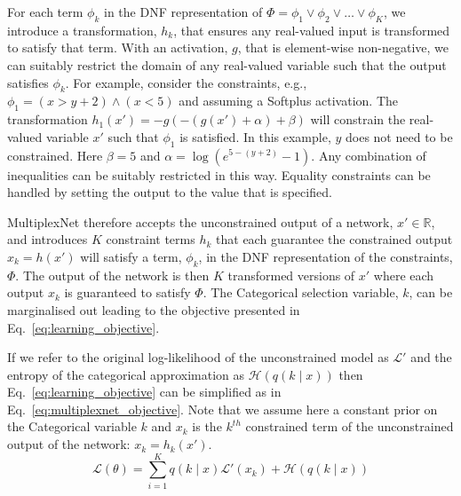 \documentclass[letterpaper]{article} %
\begin{document}
For each term $\phi_k$ in the DNF representation of $\Phi = \phi_1 \lor \phi_2 \lor \dots \lor \phi_K$, we introduce a transformation, $h_k$, that ensures any real-valued input is transformed to satisfy that term.
With an activation, $g$, that is element-wise non-negative, we can suitably restrict the domain of any real-valued variable such that the output satisfies $\phi_k$.
For example, consider the constraints, e.g., $\phi_1 = \left( x > y + 2 \right) \land \left( x < 5 \right)$ and assuming a Softplus activation.
The transformation $h_1(x') = -g(-(g(x') + \alpha) + \beta)$ will constrain the real-valued variable $x'$ such that $\phi_1$ is satisfied.
In this example, $y$ does not need to be constrained.
Here $\beta = 5$ and $\alpha = \log( e^{5 - (y + 2)} - 1)$.
Any combination of inequalities can be suitably restricted in this way.
Equality constraints can be handled by setting the output to the value that is specified.

MultiplexNet therefore accepts the unconstrained output of a network, $x' \in \mathbb{R}$, and introduces $K$ constraint terms $h_k$ that each guarantee the constrained output $x_k = h(x')$ will satisfy a term, $\phi_k$, in the DNF representation of the constraints, $\Phi$.
The output of the network is then $K$ transformed versions of $x'$ where each output $x_k$ is guaranteed to satisfy $\Phi$.
The Categorical selection variable, $k$, can be marginalised out leading to the objective presented in Eq.~\ref{eq:learning_objective}.

If we refer to the original log-likelihood of the unconstrained model as $\mathcal{L}'$ and the entropy of the categorical approximation as $\mathcal{H}(q(k\mid x))$ then  Eq.~\ref{eq:learning_objective} can be simplified as in Eq.~\ref{eq:multiplexnet_objective}. Note that we assume here a constant prior on the Categorical variable $k$ and $x_k$ is the $k^{th}$ constrained term of the unconstrained output of the network: $x_k = h_k(x')$.
\begin{equation}
    \label{eq:multiplexnet_objective}
     \mathcal{L}(\theta) = \sum\limits_{i=1}^{K} q(k \mid x) \mathcal{L'}(x_k) + \mathcal{H}(q(k \mid x))
\end{equation}
\end{document}
